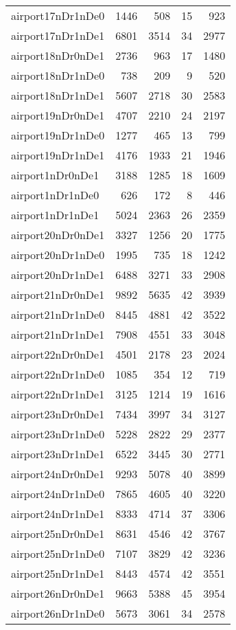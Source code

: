 \begin{longtable}{lrrrr}
airport17nDr1nDe0 & 1446 & 508 & 15 & 923 \\
airport17nDr1nDe1 & 6801 & 3514 & 34 & 2977 \\
airport18nDr0nDe1 & 2736 & 963 & 17 & 1480 \\
airport18nDr1nDe0 & 738 & 209 & 9 & 520 \\
airport18nDr1nDe1 & 5607 & 2718 & 30 & 2583 \\
airport19nDr0nDe1 & 4707 & 2210 & 24 & 2197 \\
airport19nDr1nDe0 & 1277 & 465 & 13 & 799 \\
airport19nDr1nDe1 & 4176 & 1933 & 21 & 1946 \\
airport1nDr0nDe1 & 3188 & 1285 & 18 & 1609 \\
airport1nDr1nDe0 & 626 & 172 & 8 & 446 \\
airport1nDr1nDe1 & 5024 & 2363 & 26 & 2359 \\
airport20nDr0nDe1 & 3327 & 1256 & 20 & 1775 \\
airport20nDr1nDe0 & 1995 & 735 & 18 & 1242 \\
airport20nDr1nDe1 & 6488 & 3271 & 33 & 2908 \\
airport21nDr0nDe1 & 9892 & 5635 & 42 & 3939 \\
airport21nDr1nDe0 & 8445 & 4881 & 42 & 3522 \\
airport21nDr1nDe1 & 7908 & 4551 & 33 & 3048 \\
airport22nDr0nDe1 & 4501 & 2178 & 23 & 2024 \\
airport22nDr1nDe0 & 1085 & 354 & 12 & 719 \\
airport22nDr1nDe1 & 3125 & 1214 & 19 & 1616 \\
airport23nDr0nDe1 & 7434 & 3997 & 34 & 3127 \\
airport23nDr1nDe0 & 5228 & 2822 & 29 & 2377 \\
airport23nDr1nDe1 & 6522 & 3445 & 30 & 2771 \\
airport24nDr0nDe1 & 9293 & 5078 & 40 & 3899 \\
airport24nDr1nDe0 & 7865 & 4605 & 40 & 3220 \\
airport24nDr1nDe1 & 8333 & 4714 & 37 & 3306 \\
airport25nDr0nDe1 & 8631 & 4546 & 42 & 3767 \\
airport25nDr1nDe0 & 7107 & 3829 & 42 & 3236 \\
airport25nDr1nDe1 & 8443 & 4574 & 42 & 3551 \\
airport26nDr0nDe1 & 9663 & 5388 & 45 & 3954 \\
airport26nDr1nDe0 & 5673 & 3061 & 34 & 2578 \\

\end{longtable}

